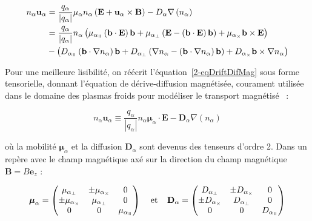 \begin{refsection}
\begin{equation}
\label{2-eqDriftDifMag}
\begin{split}
n_\alpha\mathbf u_\alpha&=\frac{q_\alpha}{|q_\alpha|}\mu_\alpha
n_\alpha\left(\mathbf E+\mathbf u_\alpha\times\mathbf
B\right)-D_\alpha\nabla\left( n_\alpha\right)
\\
&=\frac{q_\alpha}{|q_\alpha|} n_\alpha\left(\mu_{\alpha_\para}\left(\mathbf
b\cdot\mathbf E\right)\mathbf b+\mu_{\alpha_\perp}\left(\mathbf
E-\left(\mathbf
b\cdot\mathbf E\right)\mathbf
b\right)+\mu_{\alpha_\times}\mathbf
b\times\mathbf E\right)
\\
&-\left(D_{\alpha_\para}\left(\mathbf
b\cdot\nabla n_\alpha\right)\mathbf b+D_{\alpha_\perp}\left(\mathbf
\nabla n_\alpha-\left(\mathbf
b\cdot\nabla n_\alpha\right)\mathbf
b\right)+D_{\alpha_\times}\mathbf
b\times\mathbf \nabla n_\alpha\right)
\end{split}
\end{equation}

Pour une meilleure lisibilité, on réécrit l'équation~\ref{2-eqDriftDifMag}
sous forme tensorielle, donnant l'équation de dérive-diffusion magnétisée,
courament utilisée dans le domaine des plasmas froids pour modéliser le
transport magnétisé~\parencite{grephe, propulseur} :

\begin{equation}
\label{2-eqDriftDifMag2}
n_\alpha\mathbf u_\alpha\equiv
\frac{q_\alpha}{|q_\alpha|} n_\alpha\boldsymbol{\mu}_\alpha\cdot \mathbf
E-\mathbf{D}_\alpha{\nabla\left( n_\alpha\right)}
\end{equation}

où la mobilité $\boldsymbol{\mu}_\alpha$ et la diffusion $\mathbf{D}_\alpha$
sont devenus des tenseurs d'ordre 2. Dans un repère avec le champ magnétique axé
sur la direction du champ magnétique $\mathbf B=B\mathbf e_z$ :

\begin{align}
\boldsymbol{\mu}_\alpha =
 \begin{pmatrix}
  \mu_{\alpha_\perp} & \pm\mu_{\alpha_\times} & 0 \\
  \pm\mu_{\alpha_\times} & \mu_{\alpha_\perp} & 0 \\
  0  & 0  & \mu_{\alpha_\para} 
 \end{pmatrix}\;\;\;\;\text{et}\;\;\;\;
 \mathbf D_\alpha =
 \begin{pmatrix}
  D_{\alpha_\perp} & \pm D_{\alpha_\times} & 0 \\
 \pm D_{\alpha_\times} & D_{\alpha_\perp} & 0 \\
  0  & 0  & D_{\alpha_\para} 
 \end{pmatrix}
\end{align}


\end{refsection}
